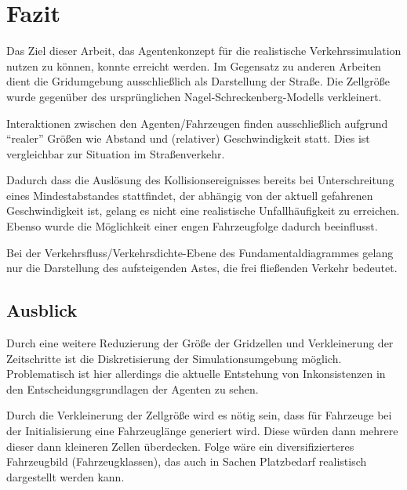 \section{Fazit}
\label{sec:fazit}

Das Ziel dieser Arbeit, das Agentenkonzept für die realistische Verkehrssimulation nutzen zu können, konnte erreicht werden.
Im Gegensatz zu anderen Arbeiten dient die Gridumgebung ausschließlich als Darstellung der Straße.
Die Zellgröße wurde gegenüber des ursprünglichen Nagel-Schreckenberg-Modells verkleinert.

Interaktionen zwischen den Agenten/Fahrzeugen finden ausschließlich aufgrund \enquote{realer} Größen wie Abstand und (relativer) Geschwindigkeit statt.
Dies ist vergleichbar zur Situation im Straßenverkehr.

Dadurch dass die Auslösung des Kollisionsereignisses bereits bei Unterschreitung eines Mindestabstandes stattfindet, der abhängig von der aktuell gefahrenen Geschwindigkeit ist, gelang es nicht eine realistische Unfallhäufigkeit zu erreichen. Ebenso wurde die Möglichkeit einer engen Fahrzeugfolge dadurch beeinflusst.

Bei der Verkehrsfluss/Verkehrsdichte-Ebene des Fundamentaldiagrammes gelang nur die Darstellung des aufsteigenden Astes, die frei fließenden Verkehr bedeutet.






\subsection{Ausblick}
\label{sec:ausblick}

Durch eine weitere Reduzierung der Größe der Gridzellen und Verkleinerung der Zeitschritte ist die Diskretisierung der Simulationsumgebung möglich.
Problematisch ist hier allerdings die aktuelle Entstehung von Inkonsistenzen in den Entscheidungsgrundlagen der Agenten zu sehen.

Durch die Verkleinerung der Zellgröße wird es nötig sein, dass für Fahrzeuge bei der Initialisierung eine Fahrzeuglänge generiert wird.
Diese würden dann mehrere dieser dann kleineren Zellen überdecken.
Folge wäre ein diversifizierteres Fahrzeugbild (Fahrzeugklassen), das auch in Sachen Platzbedarf realistisch dargestellt werden kann.

